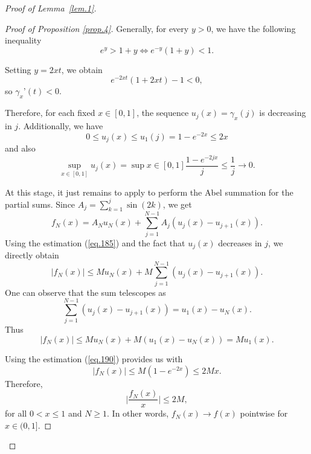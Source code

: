 \documentclass[preprint,12pt,nopreprintline]{elsarticle}
\begin{document}
\begin{proof}[Proof of Lemma~\ref{lem.1}]
\begin{proof}[Proof of Proposition \ref{prop.4}]
Generally, for every \(y>0\), we have the following inequality
\begin{equation}
e^y>1+y\iff e^{-y}\left(1+y\right)<1.
\end{equation}

Setting \(y=2xt\), we obtain
\begin{equation}
e^{-2xt}\left(1+2xt\right)-1<0,
\end{equation}
so \(\gamma_x’\left(t\right)<0\).

Therefore, for each fixed \(x\in[0,1]\), the sequence \(u_j\left(x\right)=\gamma_x\left(j\right)\) is decreasing in \(j\). Additionally, we have
\begin{equation}\label{eq.190}
0\leq u_j\left(x\right)\leq u_1\left(j\right)=1-e^{-2x}\leq 2x
\end{equation}
and also
\begin{equation}
\sup_{x\in[0,1]}u_j\left(x\right)=\sup{x\in[0,1]}\frac{1-e^{-2jx}}{j}\leq\frac{1}{j}\longrightarrow 0.
\end{equation}

At this stage, it just remains to apply to perform the Abel summation for the partial sums. Since \(A_j=\sum_{k=1}^j\operatorname{sin}\left(2k\right)\), we get
\begin{equation}
f_N\left(x\right)=A_N u_N\left(x\right)+\sum_{j=1}^{N-1}A_j\left(u_j\left(x\right)-u_{j+1}\left(x\right)\right).
\end{equation}
Using the estimation (\ref{eq.185}) and the fact that \(u_j\left(x\right)\) decreases in \(j\), we directly obtain
\begin{equation}
\vert f_N\left(x\right)\vert\leq M u_N\left(x\right)+M\sum_{j=1}^{N-1}\left(u_j\left(x\right)-u_{j+1}\left(x\right)\right).
\end{equation}
One can observe that the sum telescopes as
\begin{equation}
\sum_{j=1}^{N-1}\left(u_j\left(x\right)-u_{j+1}\left(x\right)\right)=u_1\left(x\right)-u_N\left(x\right).
\end{equation}
Thus
\begin{equation}
\vert f_N\left(x\right)\vert\leq M u_N\left(x\right)+M\left(u_1\left(x\right)-u_N\left(x\right)\right)=M u_1\left(x\right).
\end{equation}

Using the estimation (\ref{eq.190}) provides us with
\begin{equation}
\vert f_N\left(x\right)\vert\leq M\left(1-e^{-2x}\right)\leq 2Mx.
\end{equation}
Therefore,
\begin{equation}
\Big\vert\frac{f_N\left(x\right)}{x}\Big\vert\leq 2M,
\end{equation}
for all \(0<x\leq 1\) and \(N\geq 1\). In other words, \(f_N\left(x\right)\longrightarrow f\left(x\right)\) pointwise for \(x\in(0,1]\).


\end{proof}
\end{proof}
\end{document}
